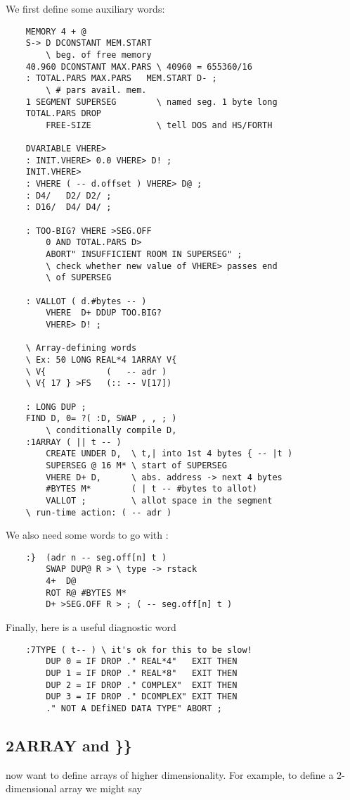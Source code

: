 We first define some auxiliary words:
\begin{lstlisting}
    MEMORY 4 + @
    S-> D DCONSTANT MEM.START
        \ beg. of free memory
    40.960 DCONSTANT MAX.PARS \ 40960 = 655360/16
    : TOTAL.PARS MAX.PARS   MEM.START D- ;
        \ # pars avail. mem.
    1 SEGMENT SUPERSEG        \ named seg. 1 byte long
    TOTAL.PARS DROP
        FREE-SIZE             \ tell DOS and HS/FORTH

    DVARIABLE VHERE>
    : INIT.VHERE> 0.0 VHERE> D! ;
    INIT.VHERE>
    : VHERE ( -- d.offset ) VHERE> D@ ;
    : D4/   D2/ D2/ ;
    : D16/  D4/ D4/ ;

    : TOO-BIG? VHERE >SEG.OFF
        0 AND TOTAL.PARS D>
        ABORT" INSUFFICIENT ROOM IN SUPERSEG" ;
        \ check whether new value of VHERE> passes end
        \ of SUPERSEG

    : VALLOT ( d.#bytes -- )
        VHERE  D+ DDUP TOO.BIG?
        VHERE> D! ;

    \ Array-defining words
    \ Ex: 50 LONG REAL*4 1ARRAY V{
    \ V{            (   -- adr )
    \ V{ 17 } >FS   (:: -- V[17])

    : LONG DUP ;
    FIND D, 0= ?( :D, SWAP , , ; )
        \ conditionally compile D,
    :1ARRAY ( || t -- )
        CREATE UNDER D,  \ t,| into 1st 4 bytes { -- |t )
        SUPERSEG @ 16 M* \ start of SUPERSEG
        VHERE D+ D,      \ abs. address -> next 4 bytes
        #BYTES M*        ( | t -- #bytes to allot)
        VALLOT ;         \ allot space in the segment
    \ run-time action: ( -- adr )
\end{lstlisting}

We also need some words to go with :
\begin{lstlisting}
    :}  (adr n -- seg.off[n] t )
        SWAP DUP@ R > \ type -> rstack
        4+  D@
        ROT R@ #BYTES M*
        D+ >SEG.OFF R > ; ( -- seg.off[n] t )
\end{lstlisting}

Finally, here is a useful diagnostic word

\begin{lstlisting}
    :7TYPE ( t-- ) \ it's ok for this to be slow!
        DUP 0 = IF DROP ." REAL*4"   EXIT THEN
        DUP 1 = IF DROP ." REAL*8"   EXIT THEN
        DUP 2 = IF DROP ." COMPLEX"  EXIT THEN
        DUP 3 = IF DROP ." DCOMPLEX" EXIT THEN
        ." NOT A DEfiNED DATA TYPE" ABORT ;
\end{lstlisting}

\subsection{2ARRAY and \}\} }
 now want to define arrays of higher dimensionality. For example, to define a 2-dimensional array we might say

